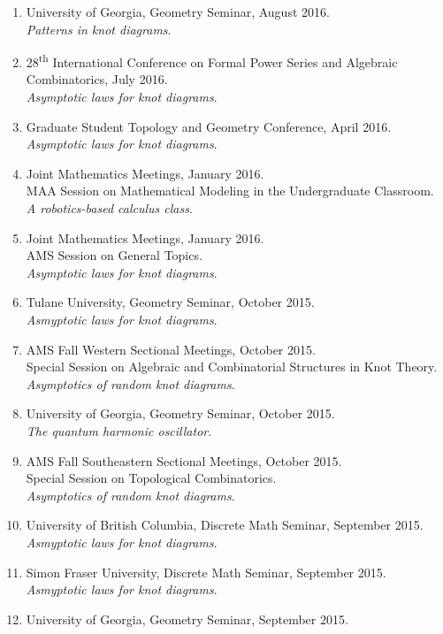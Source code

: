 \documentclass[letterpaper]{article}
\begin{document}
\begin{enumerate}
\item University of Georgia, Geometry Seminar, August 2016.\\
  \textit{Patterns in knot diagrams}.
\item 28\textsuperscript{th} International Conference on Formal Power Series and
  Algebraic Combinatorics, July 2016.\\
  \textit{Asymptotic laws for knot diagrams}.
\item Graduate Student Topology and Geometry Conference, April 2016.\\
  \textit{Asymptotic laws for knot diagrams}.
\item Joint Mathematics Meetings, January 2016.\\
  MAA Session on Mathematical Modeling in the Undergraduate Classroom. \\
  \textit{A robotics-based calculus class}.
\item Joint Mathematics Meetings, January 2016.\\
  AMS Session on General Topics. \\
  \textit{Asymptotic laws for knot diagrams}.
\item Tulane University, Geometry Seminar, October 2015.\\
  \textit{Asmyptotic laws for knot diagrams}.
\item AMS Fall Western Sectional Meetings, October 2015.\\
  Special Session on Algebraic and Combinatorial Structures in Knot Theory. \\
  \textit{Asymptotics of random knot diagrams}.
\item University of Georgia, Geometry Seminar, October 2015.\\
  \textit{The quantum harmonic oscillator}.
\item AMS Fall Southeastern Sectional Meetings, October 2015.\\
  Special Session on Topological Combinatorics. \\
  \textit{Asymptotics of random knot diagrams}.
\item University of British Columbia, Discrete Math Seminar, September 2015.\\
  \textit{Asmyptotic laws for knot diagrams}.
\item Simon Fraser University, Discrete Math Seminar, September 2015.\\
  \textit{Asmyptotic laws for knot diagrams}.
\item University of Georgia, Geometry Seminar, September 2015.\\

\end{enumerate}
\end{document}
